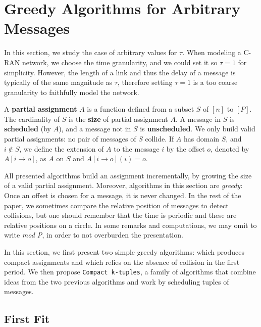 \documentclass[pdflatex,sn-mathphys,iicol]{sn-jnl}%
\theoremstyle{thmstyleone}%
\theoremstyle{thmstyletwo}%
\theoremstyle{thmstylethree}%
\begin{document}
\section{Greedy Algorithms for Arbitrary Messages} \label{sec:large}

In this section, we study the case of arbitrary values for $\tau$. When modeling a C-RAN network, we choose the time granularity, and we could set it so $\tau = 1$ for simplicity. However, the length of a link and thus the delay of a message is typically of the same magnitude as $\tau$, therefore setting $\tau = 1$ is a too coarse granularity to faithfully model the network.

A \textbf{partial assignment} $A$ is a function defined from a subset $S$ of $[n]$ to $[P]$.
The cardinality of $S$ is the \textbf{size} of partial assignment $A$. A message in $S$ is \textbf{scheduled} (by $A$), and a message not in $S$ is \textbf{unscheduled}. We only build valid partial assignments: no pair of messages of $S$ collide. If $A$ has domain $S$, and $i \notin S$, we define the extension of $A$ to the message $i$ by the offset $o$, denoted by $A[i \rightarrow o]$, as $A$ on $S$ and $A[i \rightarrow o](i) = o$.

All presented algorithms build an assignment incrementally, by growing the size of a valid partial assignment. Moreover, algorithms in this section are \emph{greedy}: Once an offset is chosen for a message, it is never changed. In the rest of the paper, we sometimes compare the relative position of messages to detect collisions, but one should remember that the time is periodic and these are relative positions on a circle. 
In some remarks and computations, we may omit to write \emph{mod P}, in order to not overburden the presentation.

 In this section, we first present two simple greedy algorithms:
 \firstfit which produces compact assignments and \metaoffset which 
 relies on the absence of collision in the first period. We then propose \texttt{Compact k-tuples}, a family of algorithms that combine ideas from the two previous algorithms and work by scheduling tuples of messages.

\subsection{First Fit}
\end{document}
